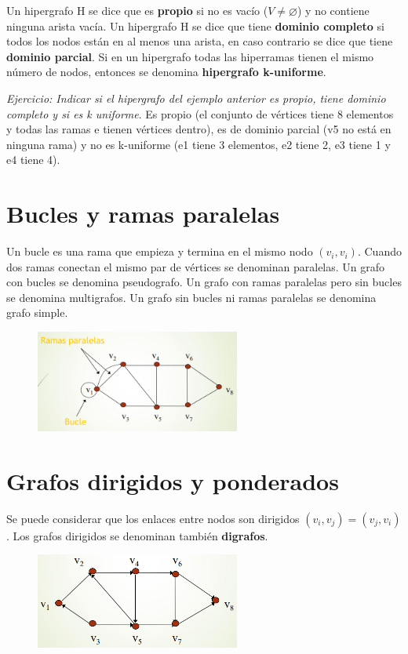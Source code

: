 Un hipergrafo H se dice que es \textbf{propio} si no es vacío ($V\neq \varnothing$) y no contiene ninguna arista vacía. Un hipergrafo H se dice que tiene \textbf{dominio completo} si todos los nodos están en al menos una arista, en caso contrario se dice que tiene \textbf{dominio parcial}. Si en un hipergrafo todas las hiperramas tienen el mismo número de nodos, entonces se denomina \textbf{hipergrafo k-uniforme}. 

\textit{Ejercicio: Indicar si el hipergrafo del ejemplo anterior es propio, tiene dominio completo y si es k uniforme}. Es propio (el conjunto de vértices tiene 8 elementos y todas las ramas e tienen vértices dentro), es de dominio parcial (v5 no está en ninguna rama) y no es k-uniforme (e1 tiene 3 elementos, e2 tiene 2, e3 tiene 1 y e4 tiene 4).

\section{Bucles y ramas paralelas}
Un bucle es una rama que empieza y termina en el mismo nodo $(v_i, v_i)$. Cuando dos ramas conectan el mismo par de vértices se denominan paralelas. Un grafo con bucles se denomina pseudografo. Un grafo con ramas paralelas pero sin bucles se denomina multigrafos. Un grafo sin bucles ni ramas paralelas se denomina grafo simple.

\begin{figure}[h]
\centering
\includegraphics[width = 0.6\textwidth]{figs/bucle-rama-paralela.png}
\end{figure}

\section{Grafos dirigidos y ponderados}
Se puede considerar que los enlaces entre nodos son dirigidos $(v_i, v_j) = (v_j, v_i)$. Los grafos dirigidos se denominan también \textbf{digrafos}.

\begin{figure}[h]
\centering
\includegraphics[width = 0.6\textwidth]{figs/grafo-dirigido.png}
\end{figure}

